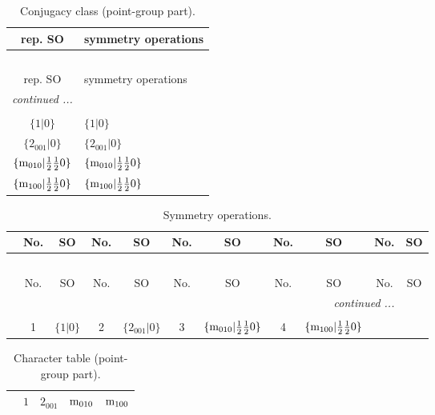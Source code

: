 \documentclass[fleqn,10pt,landscape]{article}
\begin{document}
\begin{itemize}
\begin{center}
\renewcommand{\arraystretch}{1.3}
\begin{longtable}{c|l}
\caption{Conjugacy class (point-group part).}
 \\
 \hline \hline
rep. SO & symmetry operations \\ \hline \endfirsthead

\multicolumn{1}{l}{\tablename\ \thetable{}} \\
 \hline \hline
rep. SO & symmetry operations \\ \hline \endhead

 \hline \hline
\multicolumn{1}{r}{\footnotesize\it continued ...} \\ \endfoot

 \hline \hline
\multicolumn{1}{r}{} \\ \endlastfoot

$\{1|0\}$ & $\{1|0\}$ \\ \hline
$\{2{}_{001}|0\}$ & $\{2{}_{001}|0\}$ \\ \hline
$\{{\rm m}_{010}|\frac{1}{2} \frac{1}{2} 0\}$ & $\{{\rm m}_{010}|\frac{1}{2} \frac{1}{2} 0\}$ \\ \hline
$\{{\rm m}_{100}|\frac{1}{2} \frac{1}{2} 0\}$ & $\{{\rm m}_{100}|\frac{1}{2} \frac{1}{2} 0\}$ \\
\end{longtable}
\end{center}
\begin{center}
\renewcommand{\arraystretch}{1.3}
\begin{longtable}{c|cc|cc|cc|cc|cc}
\caption{Symmetry operations.}
 \\
 \hline \hline
 & No. & SO & No. & SO & No. & SO & No. & SO & No. & SO \\ \hline \endfirsthead

\multicolumn{10}{l}{\tablename\ \thetable{}} \\
 \hline \hline
 & No. & SO & No. & SO & No. & SO & No. & SO & No. & SO \\ \hline \endhead

 \hline \hline
\multicolumn{10}{r}{\footnotesize\it continued ...} \\ \endfoot

 \hline \hline
\multicolumn{10}{r}{} \\ \endlastfoot

 & 1 & $\{1|0\}$ & 2 & $\{2{}_{001}|0\}$ & 3 & $\{{\rm m}_{010}|\frac{1}{2} \frac{1}{2} 0\}$ & 4 & $\{{\rm m}_{100}|\frac{1}{2} \frac{1}{2} 0\}$ \\
\end{longtable}
\end{center}
\begin{center}
\renewcommand{\arraystretch}{1.0}
\begin{longtable}{c|rrrr}
\caption{Character table (point-group part).}
 \\
 \hline \hline
 & $ 1 $ & $ 2{}_{001} $ & $ {\rm m}_{010} $ & $ {\rm m}_{100} $ \\ \hline \endfirsthead


\end{longtable}
\end{center}
\end{itemize}
\end{document}
